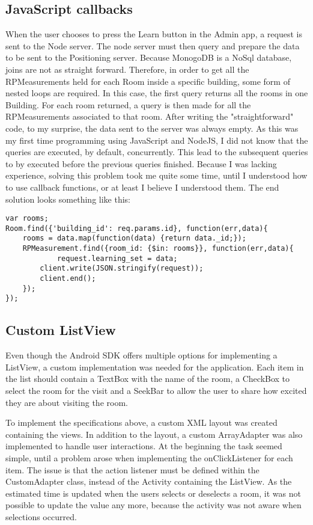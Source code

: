 \subsection{JavaScript callbacks} 
When the user chooses to press the Learn button in the Admin app, a request is sent to the Node server. The node server must then query and prepare the data to be sent to the Positioning server. Because MonogoDB is a NoSql database, joins are not as straight forward. Therefore, in order to get all the RPMeasurements held for each Room inside a specific building, some form of nested loops are required. In this case, the first query returns all the rooms in one Building. For each room returned, a query is then made for all the RPMeasurements associated to that room. After writing the "straightforward" code, to my surprise, the data sent to the server was always empty. As this was my first time programming using JavaScript and NodeJS, I did not know that the queries are executed, by default, concurrently. This lead to the subsequent queries to by executed before the previous queries finished. Because I was lacking experience, solving this problem took me quite some time, until I understood how to use callback functions, or at least I believe I understood them. The end solution looks something like this:
\begin{lstlisting}
var rooms;
Room.find({'building_id': req.params.id}, function(err,data){
	rooms = data.map(function(data) {return data._id;});
    RPMeasurement.find({room_id: {$in: rooms}}, function(err,data){
    		request.learning_set = data;
        client.write(JSON.stringify(request));
        client.end();
    });
});
\end{lstlisting}

\subsection{Custom ListView}
Even though the Android SDK offers multiple options for implementing a ListView, a custom implementation was needed for the application. Each item in the list should contain a TextBox with the name of the room, a CheckBox to select the room for the visit and a SeekBar to allow the user to share how excited they are about visiting the room. 

To implement the specifications above, a custom XML layout was created containing the views. In addition to the layout, a custom ArrayAdapter was also implemented to handle user interactions. At the beginning the task seemed simple, until a problem arose when implementing the onClickListener for each item. The issue is that the action listener must be defined within the CustomAdapter class, instead of the Activity containing the ListView. As the estimated time is updated when the users selects or deselects a room, it was not possible to update the value any more, because the activity was not aware when selections occurred. 

